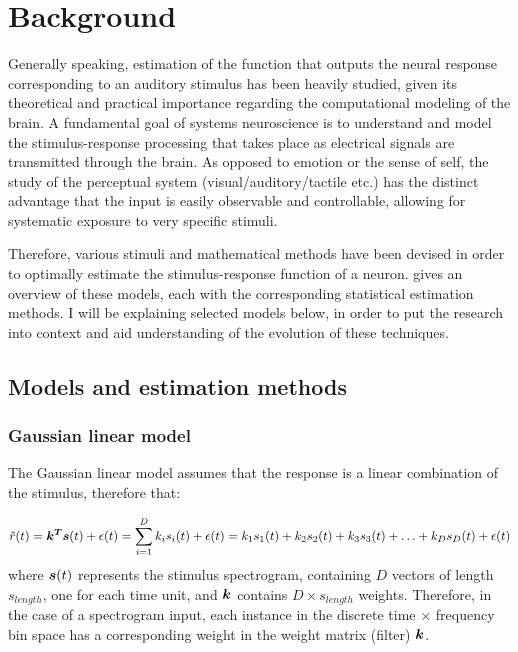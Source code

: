 \chapter{Background}\label{background}

Generally speaking, estimation of the function that outputs the neural response corresponding to an auditory stimulus has been heavily studied, given its theoretical and practical importance regarding the computational modeling of the brain. A fundamental goal of systems neuroscience is to understand and model the stimulus-response processing that takes place as electrical signals are transmitted through the brain. As opposed to emotion or the sense of self, the study of the perceptual system (visual/auditory/tactile etc.) has the distinct advantage that the input is easily observable and controllable, allowing for systematic exposure to very specific stimuli. 

Therefore, various stimuli and mathematical methods have been devised in order to optimally estimate the stimulus-response function of a neuron. \textcite{meyerModelsNeuronalStimulusResponse2017} gives an overview of these models, each with the corresponding statistical estimation methods. I will be explaining selected models below, in order to put the research into context and aid understanding of the evolution of these techniques.

\section{Models and estimation methods}

\subsection{Gaussian linear model}

The Gaussian linear model assumes that the response is a linear combination of the stimulus, therefore that:

\begin{equation*} \label{LM}
\hat{r}(t) = \bm{k^{T}}\bm{s}(t) + \epsilon(t) = \sum_{i=1}^D k_i s_i(t)  + \epsilon(t) = k_1 s_1(t) + k_2 s_2(t) + k_3 s_3(t) + \ldots + k_D s_D(t) +  \epsilon(t) 
\end{equation*}
where $\bm{s}(t)$ represents the stimulus spectrogram, containing $D$ vectors of length $s_{length}$, one for each time unit, and $\bm{k}$ contains $D \times s_{length}$ weights. Therefore, in the case of a spectrogram input, each instance in the discrete time $\times$ frequency bin space has a corresponding weight in the weight matrix (filter) $\bm{k}$.

